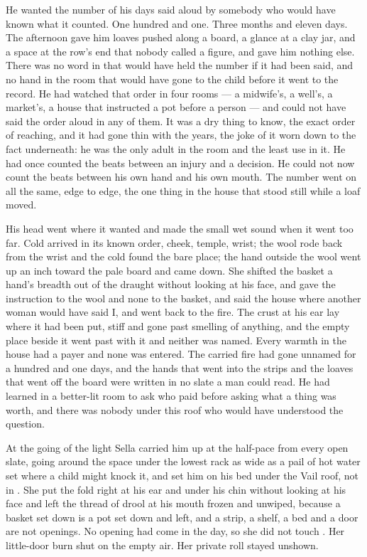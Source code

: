 He wanted the number of his days said aloud by somebody who would have known what it counted. One hundred and one. Three months and eleven days. The afternoon gave him loaves pushed along a board, a glance at a clay jar, and a space at the row's end that nobody called a figure, and gave him nothing else. There was no word in  that would have held the number if it had been said, and no hand in the room that would have gone to the child before it went to the record. He had watched that order in four rooms --- a midwife's, a well's, a market's, a house that instructed a pot before a person --- and could not have said the order aloud in any of them. It was a dry thing to know, the exact order of reaching, and it had gone thin with the years, the joke of it worn down to the fact underneath: he was the only adult in the room and the least use in it. He had once counted the beats between an injury and a decision. He could not now count the beats between his own hand and his own mouth. The number went on all the same, edge to edge, the one thing in the house that stood still while a loaf moved.

His head went where it wanted and made the small wet sound when it went too far. Cold arrived in its known order, cheek, temple, wrist; the wool rode back from the wrist and the cold found the bare place; the hand outside the wool went up an inch toward the pale board and came down. She shifted the basket a hand's breadth out of the draught without looking at his face, and gave the instruction to the wool and none to the basket, and said the house where another woman would have said I, and went back to the fire. The crust at his ear lay where it had been put, stiff and gone past smelling of anything, and the empty place beside it went past with it and neither was named. Every warmth in the house had a payer and none was entered. The carried fire had gone unnamed for a hundred and one days, and the hands that went into the strips and the loaves that went off the board were written in no slate a man could read. He had learned in a better-lit room to ask who paid before asking what a thing was worth, and there was nobody under this roof who would have understood the question.

\scenebreak

At the going of the light Sella carried him up at the half-pace from every open slate, going around the space under the lowest rack as wide as a pail of hot water set where a child might knock it, and set him on his bed under the Vail roof, not in . She put the fold right at his ear and under his chin without looking at his face and left the thread of drool at his mouth frozen and unwiped, because a basket set down is a pot set down and left, and a strip, a shelf, a bed and a door are not openings. No opening had come in the day, so she did not touch . Her little-door burn shut on the empty air. Her private roll stayed unshown.

